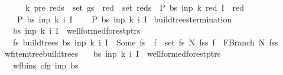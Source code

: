 \begin{isabellebody}
\ \ \ \ \ \ {\isacharparenleft}{\kern0pt}{\isacharparenleft}{\kern0pt}k{\isacharprime}{\kern0pt}{\isacharcomma}{\kern0pt}\ pre{\isacharparenright}{\kern0pt}{\isacharcomma}{\kern0pt}\ reds{\isacharparenright}{\kern0pt}\ {\isasymin}\ set\ gs\ {\isasymLongrightarrow}\ red\ {\isasymin}\ set\ reds\ {\isasymLongrightarrow}\ P\ bs\ inp\ k\ red\ {\isacharparenleft}{\kern0pt}I\ {\isasymunion}\ {\isacharbraceleft}{\kern0pt}red{\isacharbraceright}{\kern0pt}{\isacharparenright}{\kern0pt}{\isacharparenright}{\kern0pt}\ {\isasymLongrightarrow}\isanewline
\ \ \ \ P\ bs\ inp\ k\ i\ I{\isachardoublequoteclose}\ \isanewline
\ \ \ {\isachardoublequoteopen}P\ bs\ inp\ k\ i\ I{\isachardoublequoteclose}%
\isadelimproof
%
\endisadelimproof
%
\isatagproof
%
\endisatagproof
{\isafoldproof}%
%
\isadelimproof
\isanewline
%
\endisadelimproof
{}\isamarkupfalse%
\ build{\isacharunderscore}{\kern0pt}trees{\isacharprime}{\kern0pt}{\isacharunderscore}{\kern0pt}termination{\isacharcolon}{\kern0pt}\isanewline
\ \ \ {\isachardoublequoteopen}{\isacharparenleft}{\kern0pt}bs{\isacharcomma}{\kern0pt}\ inp{\isacharcomma}{\kern0pt}\ k{\isacharcomma}{\kern0pt}\ i{\isacharcomma}{\kern0pt}\ I{\isacharparenright}{\kern0pt}\ {\isasymin}\ wellformed{\isacharunderscore}{\kern0pt}forest{\isacharunderscore}{\kern0pt}ptrs{\isachardoublequoteclose}\isanewline
\ \ \ {\isachardoublequoteopen}{\isasymexists}fs{\isachardot}{\kern0pt}\ build{\isacharunderscore}{\kern0pt}trees{\isacharprime}{\kern0pt}\ bs\ inp\ k\ i\ I\ {\isacharequal}{\kern0pt}\ Some\ fs\ {\isasymand}\ {\isacharparenleft}{\kern0pt}{\isasymforall}f\ {\isasymin}\ set\ fs{\isachardot}{\kern0pt}\ {\isasymexists}N\ fss{\isachardot}{\kern0pt}\ f\ {\isacharequal}{\kern0pt}\ FBranch\ N\ fss{\isacharparenright}{\kern0pt}{\isachardoublequoteclose}%
\isadelimproof
%
\endisadelimproof
%
\isatagproof
%
\endisatagproof
{\isafoldproof}%
%
\isadelimproof
\isanewline
%
\endisadelimproof
{}\isamarkupfalse%
\ wf{\isacharunderscore}{\kern0pt}item{\isacharunderscore}{\kern0pt}tree{\isacharunderscore}{\kern0pt}build{\isacharunderscore}{\kern0pt}trees{\isacharprime}{\kern0pt}{\isacharcolon}{\kern0pt}\isanewline
\ \ \ {\isachardoublequoteopen}{\isacharparenleft}{\kern0pt}bs{\isacharcomma}{\kern0pt}\ inp{\isacharcomma}{\kern0pt}\ k{\isacharcomma}{\kern0pt}\ i{\isacharcomma}{\kern0pt}\ I{\isacharparenright}{\kern0pt}\ {\isasymin}\ wellformed{\isacharunderscore}{\kern0pt}forest{\isacharunderscore}{\kern0pt}ptrs{\isachardoublequoteclose}\isanewline
\ \ \ {\isachardoublequoteopen}wf{\isacharunderscore}{\kern0pt}bins\ cfg\ inp\ bs{\isachardoublequoteclose}\isanewline

\end{isabellebody}
